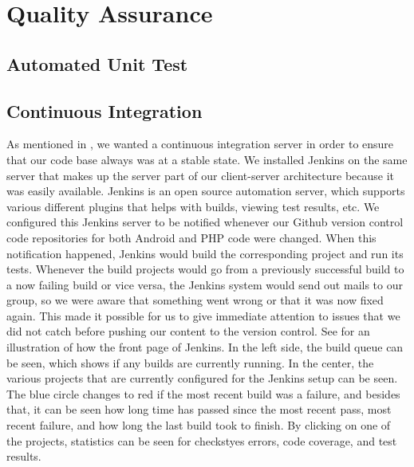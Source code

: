
\chapter{Quality Assurance}
\label{cha:quality_assurance}


\section{Automated Unit Test}
\label{sec:automated_unit_test}

\section{Continuous Integration}
\label{sec:continuous_integration}
As mentioned in , we wanted a continuous integration server in order to ensure that our code base always was at a stable state. We installed Jenkins on the same server that makes up the server part of our client-server architecture because it was easily available. Jenkins is an open source automation server, which supports various different plugins that helps with builds, viewing test results, etc. We configured this Jenkins server to be notified whenever our Github version control code repositories for both Android and PHP code were changed. When this notification happened, Jenkins would build the corresponding project and run its tests. Whenever the build projects would go from a previously successful build to a now failing build or vice versa, the Jenkins system would send out mails to our group, so we were aware that something went wrong or that it was now fixed again. This made it possible for us to give immediate attention to issues that we did not catch before pushing our content to the version control. See  for an illustration of how the front page of Jenkins. In the left side, the build queue can be seen, which shows if any builds are currently running. In the center, the various projects that are currently configured for the Jenkins setup can be seen. The blue circle changes to red if the most recent build was a failure, and besides that, it can be seen how long time has passed since the most recent pass, most recent failure, and how long the last build took to finish. By clicking on one of the projects, statistics can be seen for checkstyes errors, code coverage, and test results. 

